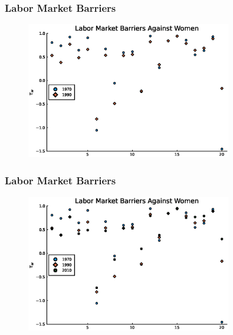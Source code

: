 \documentclass[11pt]{beamer}
\begin{document}
\begin{frame}
	\frametitle{Labor Market Barriers}
	\begin{figure}
		\begin{center}
			\includegraphics[width=0.8\textwidth]{plots/tau_w_women_70_90.eps}
			\label{ }
		\end{center}
	\end{figure}
	\hyperlink{occupations}{}
\end{frame}

\begin{frame}
	\frametitle{Labor Market Barriers}
	\label{barriers3}
	\begin{figure}
		\begin{center}
			\includegraphics[width=0.8\textwidth]{plots/tau_w_women_70_10.eps}
			\label{ }
		\end{center}
	\end{figure}
	\hyperlink{occupations}{}
	\hyperlink{aggprod}{}
\end{frame}
\end{document}
